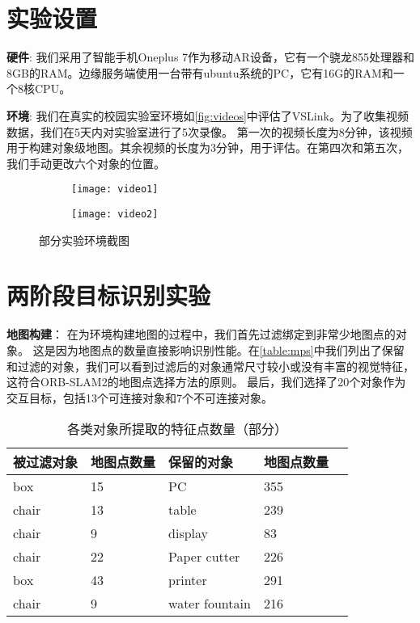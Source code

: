 \section{实验设置}
\textbf{硬件}: 我们采用了智能手机Oneplus 7作为移动AR设备，它有一个骁龙855处理器和8GB的RAM。边缘服务端使用一台带有ubuntu系统的PC，它有16G的RAM和一个8核CPU。


\textbf{环境}: 我们在真实的校园实验室环境如\autoref{fig:videos}中评估了VSLink。为了收集视频数据，我们在5天内对实验室进行了5次录像。
第一次的视频长度为8分钟，该视频用于构建对象级地图。其余视频的长度为3分钟，用于评估。在第四次和第五次，我们手动更改六个对象的位置。

\begin{figure}[htbp]
	\centering
	\begin{subfigure}{.49\linewidth}
		\texttt{[image: video1]}
		\caption{}
	\end{subfigure}
	\begin{subfigure}{.49\linewidth}
		\texttt{[image: video2]}
		\caption{}
	\end{subfigure}
	\caption{部分实验环境截图}\label{fig:videos}
\end{figure}

\section{两阶段目标识别实验}

\textbf{地图构建}：
在为环境构建地图的过程中，我们首先过滤绑定到非常少地图点的对象。
这是因为地图点的数量直接影响识别性能。在\autoref{table:mps}中我们列出了保留和过滤的对象，我们可以看到过滤后的对象通常尺寸较小或没有丰富的视觉特征，这符合ORB-SLAM2\cite{mur2017orb}的地图点选择方法的原则。
最后，我们选择了20个对象作为交互目标，包括13个可连接对象和7个不可连接对象。

\begin{table}[htbp]
	\caption{各类对象所提取的特征点数量（部分）}  \label{table:mps} 
	\begin{center}  
		\begin{tabular}{|l|l|l|l| p{4cm}|}  
			\hline  
			\textbf{被过滤对象} & \textbf{地图点数量} & \textbf{保留的对象} & \textbf{地图点数量}\\ \hline  
			box & 15 & PC & 355  \\ \hline 
			chair & 13 & table & 239  \\ \hline 
			chair & 9 & display & 83  \\ \hline  
			chair & 22 & Paper cutter & 226  \\ \hline  
			box & 43 & printer & 291  \\ \hline  
			chair & 9 & water fountain & 216  \\ \hline  
		\end{tabular}  
	\end{center}  
\end{table} 

